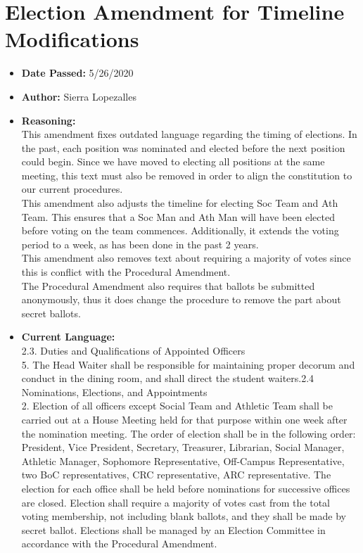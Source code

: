\documentclass[10pt]{article} %
\begin{document}
\section{Election Amendment for Timeline Modifications}
\begin{itemize}
	\item \textbf{Date Passed:} 5/26/2020
	\item \textbf{Author:} Sierra Lopezalles
	\item \textbf{Reasoning:} \\
	This amendment fixes outdated language regarding the timing of elections. In the past, each position was nominated and elected before the next position could begin. Since we have moved to electing all positions at the same meeting, this text must also be removed in order to align the constitution to our current procedures. \\
	This amendment also adjusts the timeline for electing Soc Team and Ath Team. This ensures that a Soc Man and Ath Man will have been elected before voting on the team commences. Additionally, it extends the voting period to a week, as has been done in the past 2 years. \\
	This amendment also removes text about requiring a majority of votes since this is conflict with the Procedural Amendment. \\
	The Procedural Amendment also requires that ballots be submitted anonymously, thus it does change the procedure to remove the part about secret ballots.
	\item \textbf{Current Language:} \\
	2.3. Duties and Qualifications of Appointed Officers \\
	5. The Head Waiter shall be responsible for maintaining proper decorum and conduct in the dining room, and shall direct the student waiters.2.4 Nominations, Elections, and Appointments \\
	2. Election of all officers except Social Team and Athletic Team shall be carried out at a House Meeting held for that purpose within one week after the nomination meeting. The order of election shall be in the following order: President, Vice President, Secretary, Treasurer, Librarian, Social Manager, Athletic Manager, Sophomore Representative, Off-Campus Representative, two BoC representatives, CRC representative, ARC representative. The election for each office shall be held before nominations for successive offices are closed. Election shall require a majority of votes cast from the total voting membership, not including blank ballots, and they shall be made by secret ballot. Elections shall be managed by an Election Committee in accordance with the Procedural Amendment. \\

\end{itemize}
\end{document}
